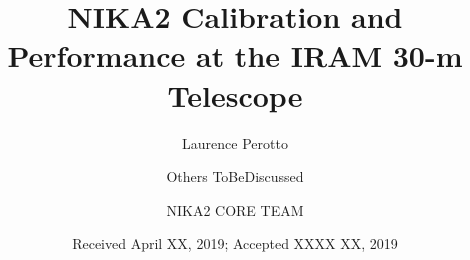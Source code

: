 \documentclass{aa}
\begin{document}
 


   \title{NIKA2 Calibration and Performance at the IRAM 30-m Telescope}

   \author{Laurence Perotto
     \and
     Others ToBeDiscussed
     \and
     NIKA2 CORE TEAM
   }


   \date{Received April XX, 2019; Accepted XXXX XX, 2019}

   
\end{document}
